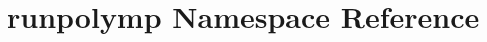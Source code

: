 \hypertarget{namespacerunpolymp}{\section{runpolymp Namespace Reference}
\label{namespacerunpolymp}
}
